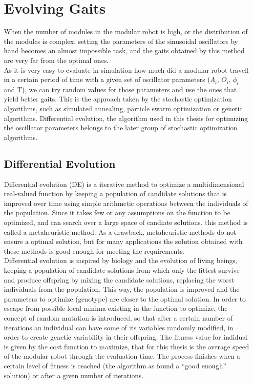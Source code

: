 \newpage
\section{Evolving Gaits}
\label{gaits_evolution}

When the number of modules in the modular robot is high, or the distribution of the modules is complex, setting the parameters of the sinusoidal oscillators by hand becomes an almost impossible task, and the gaits obtained by this method are very far from the optimal ones.\\

As it is very easy to evaluate in simulation how much did a modular robot travell in a certain period of time with a given set of oscillator parameters ($A_i$, $O_i$, $\phi_i$ and T), we can try random values for those parameters and use the ones that yield better gaits. This is the approach taken by the stochastic optimization algorithms, such as simulated annealing, particle swarm optimization or genetic algorithms. Differential evolution, the algorithm used in this thesis for optimizing the oscillator parameters belongs to the later group of stochastic optimization algorithms.\\

\subsection{Differential Evolution}
\label{evolution_DE}
Differential evolution (DE) \cite{Storn1997} is a iterative method to optimize a multidimensional real-valued function by keeping a population of candidate solutions that is improved over time using simple arithmetic operations between the individuals of the population. Since it takes few or any assumptions on the function to be optimized, and can search over a large space of candiate solutions, this method is called a metaheuristic method. As a drawback, metaheuristic methods do not ensure a optimal solution, but for many applications the solution obtained with these methods is good enough for meeting the requirements.\\

Differential evolution is inspired by biology and the evolution of living beings, keeping a population of candidate solutions from which only the fittest survive and produce offspring by mixing the candidate solutions, replacing the worst individuals from the population. This way, the population is improved and the parameters to optimize (genotype) are closer to the optimal solution. In order to escape from possible local minima existing in the function to optimize, the concept of random mutation is introduced, so that after a certain number of iterations an individual can have some of its variables randomly modified, in order to create genetic variability in their offspring. The fitness value for indidual is given by the cost function to maximize, that for this thesis is the average speed of the modular robot through the evaluation time. The process finishes when a certain level of fitness is reached (the algorithm as found a ``good enough'' solution) or after a given number of iterations.\\


